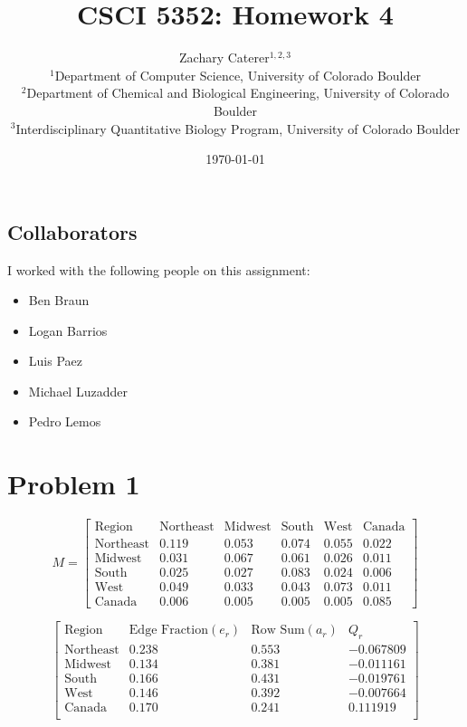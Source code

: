 \documentclass[12pt]{article}
\title{CSCI 5352: Homework 4}
\author{
    Zachary Caterer$^{1,2,3}$ \\
    \small $^1$Department of Computer Science, University of Colorado Boulder \\
    \small $^2$Department of Chemical and Biological Engineering, University of Colorado Boulder \\
    \small $^3$Interdisciplinary Quantitative Biology Program, University of Colorado Boulder
}
\date{\today}
\begin{document}
\maketitle

\subsection*{Collaborators}
I worked with the following people on this assignment:

\begin{itemize}
    \item Ben Braun
    \item Logan Barrios
    \item Luis Paez
    \item Michael Luzadder
    \item Pedro Lemos
\end{itemize}

\section*{Problem 1}
\[
M = 
\begin{bmatrix}
\text{Region} & \text{Northeast} & \text{Midwest} & \text{South} & \text{West} & \text{Canada} \\
\text{Northeast} & 0.119 & 0.053 & 0.074 & 0.055 & 0.022 \\
\text{Midwest} & 0.031 & 0.067 & 0.061 & 0.026 & 0.011 \\
\text{South} & 0.025 & 0.027 & 0.083 & 0.024 & 0.006 \\
\text{West} & 0.049 & 0.033 & 0.043 & 0.073 & 0.011 \\
\text{Canada} & 0.006 & 0.005 & 0.005 & 0.005 & 0.085
\end{bmatrix}
\]

\[
\begin{bmatrix}
  \text{Region}    &   \text{Edge Fraction} (e_r)  & \text{Row Sum} (a_r)    &   Q_r     \\
  \text{Northeast} &        0.238                  &   0.553                 &  -0.067809\\
  \text{Midwest}   &        0.134                  &   0.381                 &  -0.011161\\
  \text{South}     &        0.166                  &   0.431                 &  -0.019761\\
  \text{West}      &        0.146                  &   0.392                 &  -0.007664\\
  \text{Canada}    &        0.170                  &   0.241                 &   0.111919\\
\end{bmatrix}
\]
\end{document}
